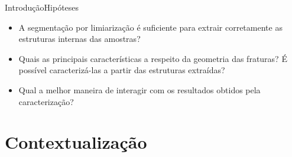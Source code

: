 \documentclass{beamer}
\begin{document}
\begin{frame}{Introdução}{Hipóteses}
    \begin{itemize}
    
    \item A segmentação por limiarização é suficiente para extrair corretamente as estruturas internas das amostras?
    
    \item Quais as principais características a respeito da geometria das fraturas? É possível caracterizá-las a partir das estruturas extraídas?
    
    \item Qual a melhor maneira de interagir com os resultados obtidos pela caracterização?
    
    \end{itemize}
\end{frame}
\section{Contextualização}
\end{document}
